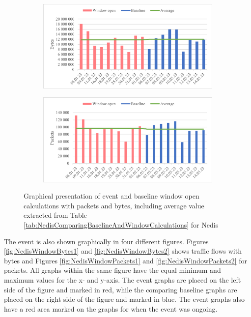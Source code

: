 \begin{figure}[H]
    \centering
    \begin{subfigure}{0.8\textwidth}
        \centering
        \includegraphics[width=1\hsize]{figures/Nedis_Window_Calculations_Bytes.png} 
    \end{subfigure}
    \begin{subfigure}{0.8\textwidth}
        \centering
        \includegraphics[width=1\hsize]{figures/Nedis_Window_Calculations_Packets.png} 
    \end{subfigure}
    \caption{Graphical presentation of event and baseline window open calculations with packets and bytes, including average value extracted from Table \ref{tab:NedisComparingBaselineAndWindowCalculations} for Nedis}
    \label{fig:NedisWindowCalculations}
\end{figure}

The event is also shown graphically in four different figures. Figures \ref{fig:NedisWindowBytes1} and \ref{fig:NedisWindowBytes2} shows traffic flows with bytes and Figures \ref{fig:NedisWindowPackets1} and \ref{fig:NedisWindowPackets2} for packets. All graphs within the same figure have the equal minimum and maximum values for the x- and y-axis. The event graphs are placed on the left side of the figure and marked in red, while the comparing baseline graphs are placed on the right side of the figure and marked in blue. The event graphs also have a red area marked on the graphs for when the event was ongoing. 

